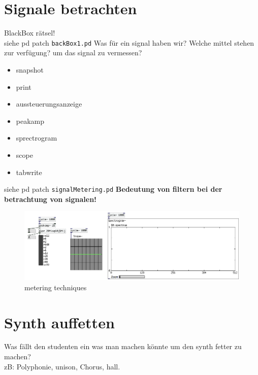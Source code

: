 


\section{Signale betrachten}
BlackBox rätsel!\\
siehe pd patch \texttt{backBox1.pd}
Was für ein signal haben wir? Welche mittel stehen zur verfügung? um das signal zu vermessen?
\begin{itemize}
	\item snapshot
	\item print
	\item aussteuerungsanzeige
	\item peakamp
	\item sprectrogram
	\item scope
	\item tabwrite
\end{itemize}

siehe pd patch \texttt{signalMetering.pd}
\textbf{
Bedeutung von filtern bei der betrachtung von signalen!
}



\begin{figure}[h]
	\begin{center}
		\includegraphics[width = 14cm]{img/metering.png}
		\caption{metering techniques}
		\label{fig:metering}
	\end{center}
\end{figure}




\section{Synth auffetten}

Was fällt den studenten ein was man machen könnte um den synth fetter zu machen?\\
zB: Polyphonie, unison, Chorus, hall.

